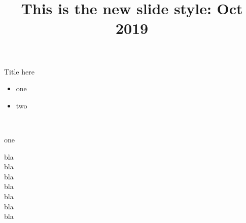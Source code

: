 \documentclass{beamer}
\begin{document}
\begin{frame}
\title{This is the new slide style: \newline Oct 2019}
\titlepage
\end{frame}

\begin{frame}{Title here}
	\begin{itemize}
		\item one
		\item two
	\end{itemize}
\\
\begin{itemizesmall}
	\item one
\end{itemizesmall}
bla\\
bla\\
bla\\
bla\\
bla\\
bla\\
bla\\
\end{frame}
\end{document}
